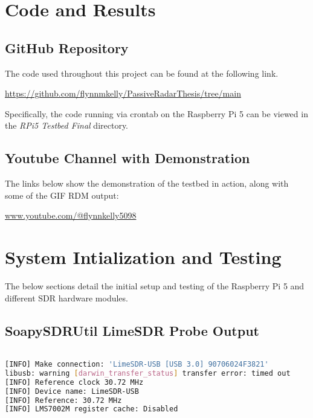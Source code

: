 \begin{appendices}
\cleardoublepage

\chapter{Code and Results \label{sec:codeResults}}

\section{GitHub Repository}

The code used throughout this project can be found at the following link. 

\vspace{1cm}
\href{https://github.com/flynnmkelly/PassiveRadarThesis/tree/main}{https://github.com/flynnmkelly/PassiveRadarThesis/tree/main}

\vspace{1cm}
\noindent{}
Specifically, the code running via crontab on the Raspberry Pi 5  can be viewed in the \textit{RPi5 Testbed Final} directory.

\section{Youtube Channel with Demonstration}

The links below show the demonstration of the testbed in action, along with some of the GIF RDM output:

\vspace{1cm}
\href{www.youtube.com/@flynnkelly5098}{www.youtube.com/@flynnkelly5098}



\chapter{System Intialization and Testing}

The below sections detail the initial setup and testing of the Raspberry Pi 5 and different SDR hardware modules.

\section{SoapySDRUtil LimeSDR Probe Output}
\begin{lstlisting}[language=bash, caption={SoapySDRUtil Probe Output for LimeSDR}, label={lst: soapyProbe}]

[INFO] Make connection: 'LimeSDR-USB [USB 3.0] 90706024F3821'
libusb: warning [darwin_transfer_status] transfer error: timed out
[INFO] Reference clock 30.72 MHz
[INFO] Device name: LimeSDR-USB
[INFO] Reference: 30.72 MHz
[INFO] LMS7002M register cache: Disabled


\end{lstlisting}
\end{appendices}
